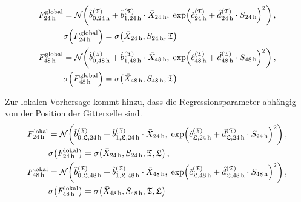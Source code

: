 \begin{align*}
F^{\mathrm{global}}_{24\h} &= \mathcal{N}\!\left(\hat{b}_{0,24\h}^{(\mathfrak{T})} + \hat{b}_{1,24\h}^{(\mathfrak{T})} \cdot \bar{X}_{24\h},\;\exp\!\left(\hat{c}^{(\mathfrak{T})}_{24\h} + \hat{d}^{(\mathfrak{T})}_{24\h}\cdot S_{24\h}\right)^2\right), \\
&\sigma\!\left( F^{\mathrm{global}}_{24\h} \right) = \sigma\!\left( \bar X_{24\h}, S_{24\h}, \mathfrak{T} \right)\\
    F^{\mathrm{global}}_{48\h} &= \mathcal{N}\!\left(\hat{b}_{0,48\h}^{(\mathfrak{T})} + \hat{b}_{1,48\h}^{(\mathfrak{T})} \cdot \bar{X}_{48\h},\;\exp\!\left(\hat{c}^{(\mathfrak{T})}_{48\h} + \hat{d}^{(\mathfrak{T})}_{48\h}\cdot S_{48\h}\right)^2\right), \\
&\sigma\!\left( F^{\mathrm{global}}_{48\h} \right) = \sigma\!\left( \bar X_{48\h}, S_{48\h}, \mathfrak{T} \right)
\end{align*}

Zur lokalen Vorhersage kommt hinzu, dass die Regressionsparameter abhängig von der Position der Gitterzelle sind.
\begin{align*}
    F^{\mathrm{lokal}}_{24\h} &= \mathcal{N}\!\left(\hat{b}_{0,\mathfrak{L},24\h}^{(\mathfrak{T})} + \hat{b}_{1,\mathfrak{L},24\h}^{(\mathfrak{T})} \cdot \bar{X}_{24\h},\;\exp\!\left(\hat{c}^{(\mathfrak{T})}_{\mathfrak{L},24\h} + \hat{d}^{(\mathfrak{T})}_{\mathfrak{L},24\h}\cdot S_{24\h}\right)^2\right), \\
&\sigma\!\left( F^{\mathrm{lokal}}_{24\h} \right) = \sigma\!\left( \bar X_{24\h}, S_{24\h}, \mathfrak{T}, \mathfrak{L} \right),\\
    F^{\mathrm{lokal}}_{48\h} &= \mathcal{N}\!\left(\hat{b}_{0,\mathfrak{L},48\h}^{(\mathfrak{T})} + \hat{b}_{1,\mathfrak{L},48\h}^{(\mathfrak{T})} \cdot \bar{X}_{48\h},\;\exp\!\left(\hat{c}^{(\mathfrak{T})}_{\mathfrak{L},48\h} + \hat{d}^{(\mathfrak{T})}_{\mathfrak{L},48\h}\cdot S_{48\h}\right)^2\right), \\
&\sigma\!\left(F^{\mathrm{lokal}}_{48\h}\right) = \sigma\!\left( \bar X_{48\h}, S_{48\h}, \mathfrak{T}, \mathfrak{L} \right)
\end{align*}


